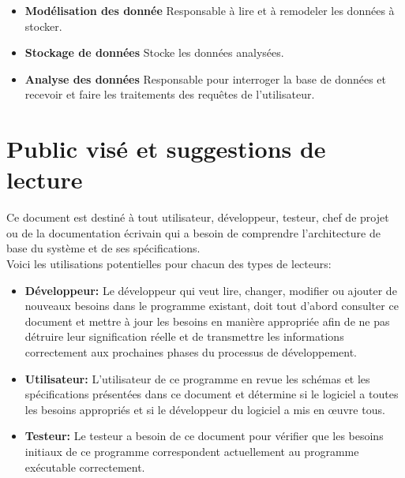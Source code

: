 \documentclass{scrreprt}
\begin{document}
\begin{itemize}
  \item \textbf{Modélisation des donnée} \- Responsable à lire et à remodeler les données à stocker.
  \item \textbf{Stockage de données} \- Stocke les données analysées.
  \item \textbf{Analyse des données} \- Responsable pour interroger la base de données et recevoir et faire les traitements des requêtes de l'utilisateur.

\end{itemize}


 \section{Public visé et suggestions de lecture}

Ce document est destiné à tout utilisateur, développeur, testeur, chef de projet ou de la documentation écrivain qui a besoin de comprendre l'architecture de base du système et de ses spécifications.\\
Voici les utilisations potentielles pour chacun des types de lecteurs:\\
\begin{itemize}

\item \textbf{Développeur: }Le développeur qui veut lire, changer, modifier ou ajouter de nouveaux besoins dans le programme existant, doit tout d'abord consulter ce document et mettre à jour les besoins en manière appropriée afin de ne pas détruire leur signification réelle et de transmettre les informations correctement aux prochaines phases du processus de développement.\\

\item \textbf{Utilisateur: }L'utilisateur de ce programme en revue les schémas et les spécifications présentées dans ce document et détermine si le logiciel a toutes les besoins appropriés et si le développeur du logiciel a mis en œuvre tous.\\

\item \textbf{Testeur: }Le testeur a besoin de ce document pour vérifier que les besoins initiaux de ce programme correspondent actuellement  au programme exécutable correctement.\\
\end{itemize}
\end{document}
